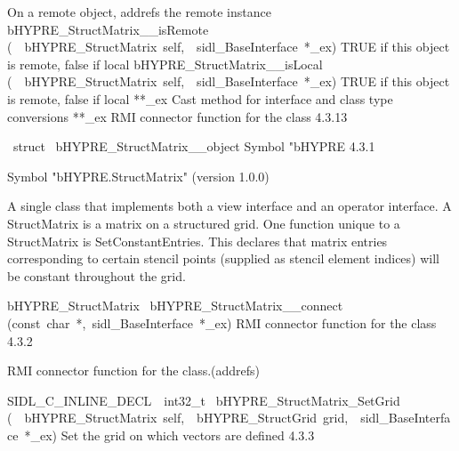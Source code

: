 \documentclass{article}
\begin{document}
\begin{cxxentry}
\begin{cxxentry}
\begin{cxxnames}
        {
On a remote object, addrefs the remote instance}
        {}
\label{cxx.4.3.36}
        {bHYPRE\_StructMatrix\_\_isRemote}
        {(\ \ bHYPRE\_StructMatrix\ self,\ \ sidl\_BaseInterface\ *\_ex)}
        {
TRUE if this object is remote, false if local}
        {}
\label{cxx.4.3.37}
        {bHYPRE\_StructMatrix\_\_isLocal}
        {(\ \ bHYPRE\_StructMatrix\ self,\ \ sidl\_BaseInterface\ *\_ex)}
        {
TRUE if this object is remote, false if local}
        {}
\label{cxx.4.3.38}
        {**\_ex}
        {}
        {
Cast method for interface and class type conversions}
        {}
\label{cxx.4.3.39}
        {**\_ex}
        {}
        {
RMI connector function for the class}
        {4.3.13}
\end{cxxnames}
\begin{cxxvariable}
{\ struct\ }
        {bHYPRE\_StructMatrix\_\_object}
        {}
        {
Symbol "bHYPRE}
        {4.3.1}
\begin{cxxdoc}

Symbol "bHYPRE.StructMatrix" (version 1.0.0)

A single class that implements both a view interface and an
operator interface.
A StructMatrix is a matrix on a structured grid.
One function unique to a StructMatrix is SetConstantEntries.
This declares that matrix entries corresponding to certain stencil points
(supplied as stencil element indices) will be constant throughout the grid.
\end{cxxdoc}
\end{cxxvariable}
\begin{cxxfunction}
{bHYPRE\_StructMatrix\ }
        {bHYPRE\_StructMatrix\_\_connect}
        {(const\ char\ *,\ sidl\_BaseInterface\ *\_ex)}
        {
RMI connector function for the class}
        {4.3.2}
\begin{cxxdoc}

RMI connector function for the class.(addrefs)
\end{cxxdoc}
\end{cxxfunction}
\begin{cxxfunction}
{SIDL\_C\_INLINE\_DECL\ \ int32\_t\ }
        {bHYPRE\_StructMatrix\_SetGrid}
        {(\ \ bHYPRE\_StructMatrix\ self,\ \ bHYPRE\_StructGrid\ grid,\ \ sidl\_BaseInterface\ *\_ex)}
        {
Set the grid on which vectors are defined}
        {4.3.3}
\begin{cxxdoc}


\end{cxxdoc}
\end{cxxfunction}
\end{cxxentry}
\end{cxxentry}
\end{document}
